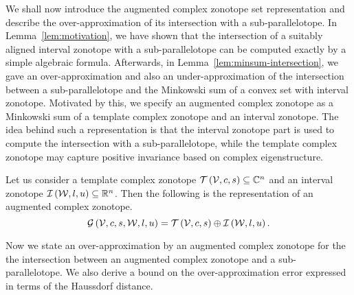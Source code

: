 We shall now introduce the augmented complex zonotope set
representation and describe the over-approximation of its intersection
with a sub-parallelotope.  In Lemma~\ref{lem:motivation}, we have shown that the
intersection of a suitably aligned interval zonotope with a
sub-parallelotope can be computed exactly by a simple algebraic
formula.  Afterwards, in Lemma~\ref{lem:minsum-intersection}, we gave
an over-approximation and also an under-approximation of the intersection
between a sub-parallelotope and the Minkowski sum of a convex set with
interval zonotope.  Motivated by this, we specify an augmented complex zonotope
as a Minkowski sum of a template complex zonotope and an interval
zonotope.  The idea behind such a representation is that the interval
zonotope part is used to compute the intersection with a
sub-parallelotope, while the template complex zonotope may capture
positive invariance based on complex eigenstructure.
%
\begin{definition}
Let us consider a template complex zonotope
$\mathit{\operatorname{\mathcal{T}}}\left(\mathcal{V},c,s\right)\subseteq\mathbb{C}^n$ and an interval
zonotope $\mathit{\operatorname{\mathcal{I}}}\left(\mathcal{W},l,u\right)\subseteq\mathbb{R}^n$.  Then the
following is the representation of an augmented complex zonotope.
%
\[
\mathcal{G}\left(\mathcal{V},c,s,\mathcal{W},l,u\right)=\mathit{\operatorname{\mathcal{T}}}\left(\mathcal{V},c,s\right)\oplus \mathit{\operatorname{\mathcal{I}}}\left(\mathcal{W},l,u\right).
\]
%
\end{definition}
%
Now we state an over-approximation by
an augmented complex zonotope for the
the intersection between an augmented complex zonotope and a
sub-parallelotope.  We also derive a bound on the over-approximation
error expressed in terms of the Haussdorf distance.

